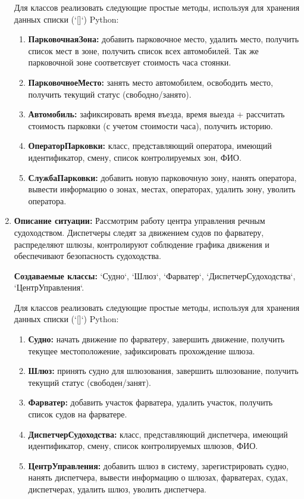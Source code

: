 \begin{enumerate}
Для классов реализовать следующие простые методы, используя для хранения данных списки (`[]`) Python:
\begin{enumerate}
    \item \textbf{ПарковочнаяЗона:} добавить парковочное место, 
    удалить место, получить список мест в зоне, получить список всех автомобилей. Так же парковочной зоне 
    соответсвует стоимость часа стоянки.
    \item \textbf{ПарковочноеМесто:} занять место автомобилем, 
    освободить место, получить текущий статус (свободно/занято).
    \item \textbf{Автомобиль:} зафиксировать время въезда, время выезда + 
    рассчитать стоимость парковки (с учетом стоимости часа), получить историю.
    \item \textbf{ОператорПарковки:} класс, представляющий оператора, 
    имеющий идентификатор, смену, список контролируемых зон, ФИО.
    \item \textbf{СлужбаПарковки:} добавить новую парковочную зону, 
    нанять оператора, вывести информацию о зонах, местах, операторах, удалить зону, уволить оператора.
\end{enumerate}

\item \textbf{Описание ситуации:} Рассмотрим работу центра управления речным судоходством. 
Диспетчеры следят за движением судов по фарватеру, 
распределяют шлюзы, контролируют соблюдение графика движения 
и обеспечивают безопасность судоходства.

\textbf{Создаваемые классы:} `Судно`, `Шлюз`, `Фарватер`, `ДиспетчерСудоходства`, `ЦентрУправления`.

Для классов реализовать следующие простые методы, используя для хранения данных списки (`[]`) Python:
\begin{enumerate}
    \item \textbf{Судно:} начать движение по фарватеру, завершить движение, 
    получить текущее местоположение, зафиксировать прохождение шлюза.
    \item \textbf{Шлюз:} принять судно для шлюзования, 
    завершить шлюзование, получить текущий статус (свободен/занят).
    \item \textbf{Фарватер:} добавить участок фарватера, 
    удалить участок, получить список судов на фарватере.
    \item \textbf{ДиспетчерСудоходства:} класс, представляющий диспетчера, 
    имеющий идентификатор, смену, список контролируемых шлюзов, ФИО.
    \item \textbf{ЦентрУправления:} добавить шлюз в систему, 
    зарегистрировать судно, нанять диспетчера, 
    вывести информацию о шлюзах, фарватерах, судах, диспетчерах, удалить шлюз, уволить диспетчера.
\end{enumerate}


\end{enumerate}
